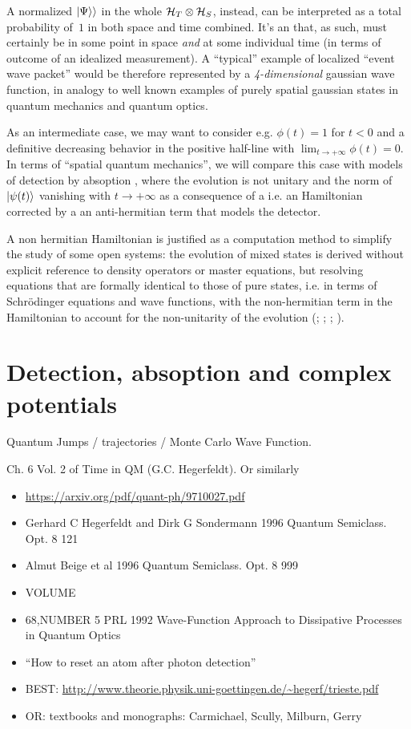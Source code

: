 A normalized $|\Psi\rangle\rangle$ in the whole $\mathcal{H}_T \otimes \mathcal{H}_S$,
instead,
can be interpreted as a total probability of~$1$ in both space and time combined.
It's an  that, as such, must certainly be in some point in space
\emph{and} at some individual time (in terms of outcome of an idealized measurement).
A ``typical'' example of localized ``event wave packet'' would be
therefore represented by
a \emph{4-dimensional} gaussian wave function,
in analogy to well known examples of purely spatial gaussian states
in quantum mechanics and quantum optics.

As an intermediate case, we may want to consider e.g.
$\phi(t) = 1$ for $t < 0 $ and a definitive decreasing behavior
in the positive half-line with $\lim_{t \to +\infty} \phi(t) = 0$.
In terms of ``spatial quantum mechanics'', we will compare this case with
models of detection by absoption \parencite{RuschhauptAbsorption},
where the evolution is not unitary and
the norm of $\ket{\psi(t)}$ vanishing with $t \to +\infty$
as a consequence of a 
i.e.
an Hamiltonian corrected by a an anti-hermitian term
that models the detector.

A non hermitian Hamiltonian is justified as a computation method
to simplify the study of some open systems: the evolution of mixed
states is derived without explicit reference to density operators
or master equations, but resolving equations that are formally
identical to those of pure states,
i.e. in terms of
Schr{\"o}dinger equations and wave functions,
with the non-hermitian term in the Hamiltonian
to account for the non-unitarity of the evolution
(\cite[Ch. 6]{TQM2}; \cite{Wave-function_approach}; \cite{HowToResetAnAtom}; \cite{TheQuantumJumpApproach}).

\section{Detection, absoption and complex potentials}

Quantum Jumps / trajectories / Monte Carlo Wave Function.

Ch. 6 Vol. 2 of Time in QM (G.C. Hegerfeldt). Or similarly
\begin{itemize}
  \item \url{https://arxiv.org/pdf/quant-ph/9710027.pdf}
  \item Gerhard C Hegerfeldt and Dirk G Sondermann 1996 Quantum Semiclass. Opt. 8 121
  \item  Almut Beige et al 1996 Quantum Semiclass. Opt. 8 999
  \item VOLUME
  \item 68,NUMBER 5 PRL 1992 Wave-Function Approach to Dissipative Processes in Quantum Optics
  \item ``How to reset an atom after photon detection'' 
  \item BEST: \url{http://www.theorie.physik.uni-goettingen.de/~hegerf/trieste.pdf}
  \item OR: textbooks and monographs: Carmichael, Scully, Milburn, Gerry
\end{itemize}

